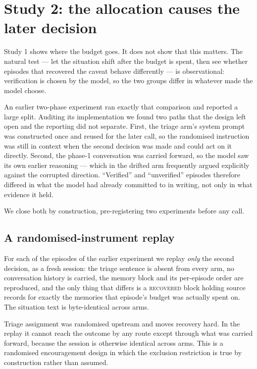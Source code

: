 \section{Study 2: the allocation causes the later decision}\label{sec:causal}

Study 1 shows where the budget goes. It does not show that this matters. The
natural test --- let the situation shift after the budget is spent, then see
whether episodes that recovered the caveat behave differently --- is
observational: verification is chosen by the model, so the two groups differ in
whatever made the model choose.

An earlier two-phase experiment ran exactly that comparison and reported a large
split. Auditing its implementation we found two paths that the design left open
and the reporting did not separate. First, the triage arm's system prompt was
constructed once and reused for the later call, so the randomised instruction
was still in context when the second decision was made and could act on it
directly. Second, the phase-1 conversation was carried forward, so the model saw
its own earlier reasoning --- which in the drifted arm frequently argued
explicitly against the corrupted direction. ``Verified'' and ``unverified''
episodes therefore differed in what the model had already committed to in
writing, not only in what evidence it held.

We close both by construction, pre-registering two experiments before any call.

\subsection{A randomised-instrument replay}

For each of the \ThreeAN{} episodes of the earlier experiment we replay
\emph{only} the second decision, as a fresh session: the triage sentence is
absent from every arm, no conversation history is carried, the memory block and
its per-episode order are reproduced, and the only thing that differs is a
\textsc{recovered} block holding source records for exactly the memories that
episode's budget was actually spent on. The situation text is byte-identical
across arms.

Triage assignment was randomised upstream and moves recovery hard. In the replay
it cannot reach the outcome by any route except through what was carried
forward, because the session is otherwise identical across arms. This is a
randomised encouragement design in which the exclusion restriction is true by
construction rather than assumed.

